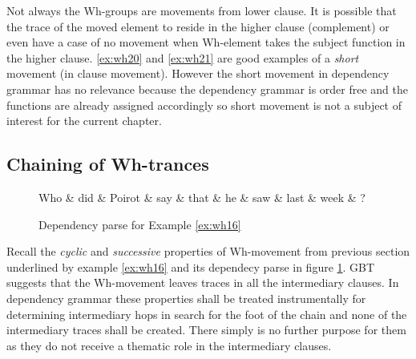 Not always the Wh-groups are movements from lower clause. It is possible that the trace of the moved element to reside in the higher clause (complement) or even have a case of no movement when Wh-element takes the subject function in the higher clause. \ref{ex:wh20} and \ref{ex:wh21} are good examples of a \textit{short} movement (in clause movement). However the short movement in dependency grammar has no relevance because the dependency grammar is order free and the functions are already assigned accordingly so short movement is not a subject of interest for the current chapter.

\subsection{Chaining of Wh-trances}
\label{sec:wh-traces}
\begin{figure}[H]
	\centering
	\begin{dependency}
		\begin{deptext}[]
			Who \& did \& Poirot \& say \& that \& he \& saw \& last \& week \& ?\\
		\end{deptext}
	\end{dependency}
	\caption{Dependency parse for Example \ref{ex:wh16}}
	\label{fig:e17}
\end{figure}

Recall the \textit{cyclic} and \textit{successive} properties of Wh-movement from previous section underlined by example \ref{ex:wh16} and its dependecy parse in figure \ref{fig:e17}. GBT suggests that the Wh-movement leaves traces in all the intermediary clauses. In dependency grammar these properties shall be treated instrumentally for determining intermediary hops in search for the foot of the chain and none of the intermediary traces shall be created. There simply is no further purpose for them as they do not receive a thematic role in the intermediary clauses. 


